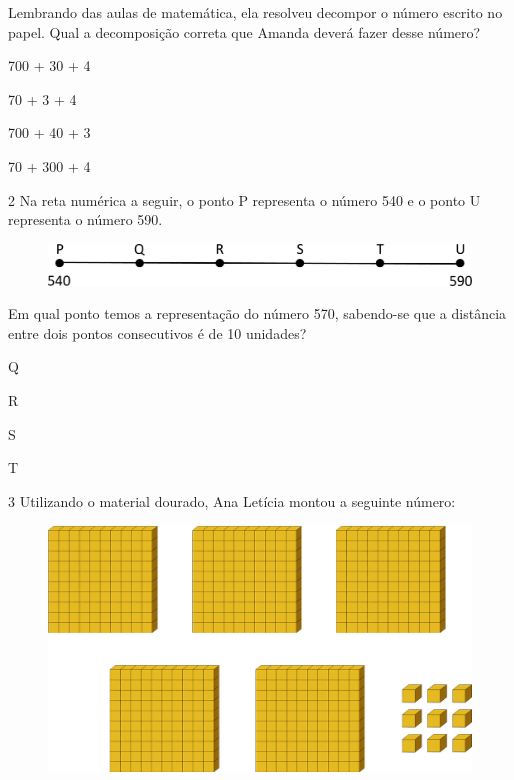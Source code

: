 Lembrando das aulas de matemática, ela resolveu decompor o número escrito
no papel. Qual a decomposição correta que Amanda deverá fazer desse
número?

\begin{escolha}
\item
  700 + 30 + 4
\item
  70 + 3 + 4
\item
  700 + 40 + 3
\item
  70 + 300 + 4
\end{escolha}

\num{2} Na reta numérica a seguir, o ponto P representa o número 540 e o ponto U representa o número 590.

\begin{figure}[htpb!]
\centering
\includegraphics[width=\textwidth]{./media/image8.png}
\end{figure}

Em qual ponto temos a representação do número 570, sabendo-se que a
distância entre dois pontos consecutivos é de 10 unidades?

\begin{escolha}
\item
  Q
\item
  R
\item
  S
\item
  T
\end{escolha}

\num{3} Utilizando o material dourado, Ana Letícia montou a seguinte número:

\begin{figure}[htpb!]
\centering
\includegraphics[width=\textwidth]{./media/image9.png}
\end{figure}

